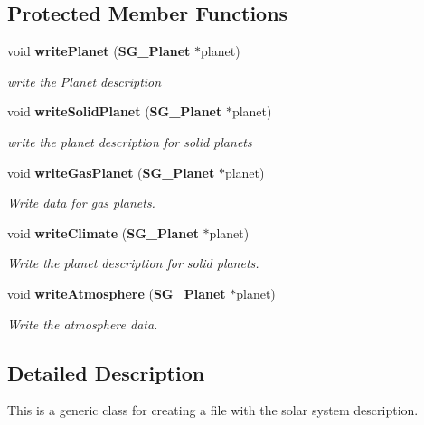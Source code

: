 \subsection*{Protected Member Functions}
\begin{CompactItemize}
\item 
void {\bf write\-Planet} ({\bf SG\_\-Planet} $\ast$planet)\label{class_s_g___file_b1}

\begin{CompactList}\small\item\em write the Planet description \item\end{CompactList}\item 
void {\bf write\-Solid\-Planet} ({\bf SG\_\-Planet} $\ast$planet)\label{class_s_g___file_b2}

\begin{CompactList}\small\item\em write the planet description for solid planets \item\end{CompactList}\item 
void {\bf write\-Gas\-Planet} ({\bf SG\_\-Planet} $\ast$planet)
\begin{CompactList}\small\item\em Write data for gas planets. \item\end{CompactList}\item 
void {\bf write\-Climate} ({\bf SG\_\-Planet} $\ast$planet)\label{class_s_g___file_b4}

\begin{CompactList}\small\item\em Write the planet description for solid planets. \item\end{CompactList}\item 
void {\bf write\-Atmosphere} ({\bf SG\_\-Planet} $\ast$planet)\label{class_s_g___file_b5}

\begin{CompactList}\small\item\em Write the atmosphere data. \item\end{CompactList}\end{CompactItemize}


\subsection{Detailed Description}
This is a generic class for creating a file with the solar system description. 

